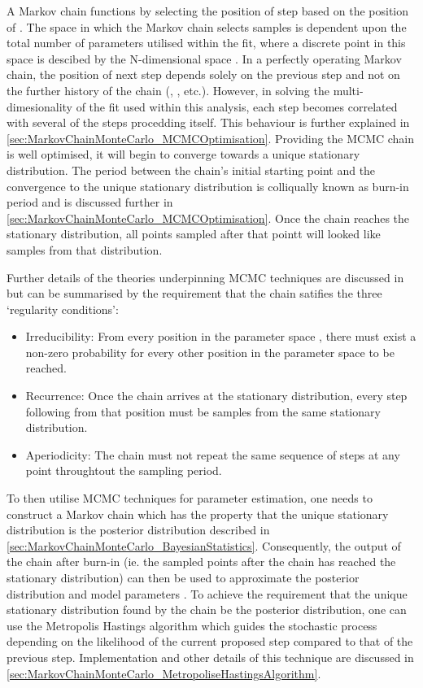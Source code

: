 A Markov chain functions by selecting the position of step  based on the position of . The space in which the Markov chain selects samples is dependent upon the total number of parameters utilised within the fit, where a discrete point in this space is descibed by the N-dimensional space . In a perfectly operating Markov chain, the position of next step depends solely on the previous step and not on the further history of the chain (, , etc.). However, in solving the multi-dimesionality of the fit used within this analysis, each step becomes correlated with several of the steps procedding itself. This behaviour is further explained in \autoref{sec:MarkovChainMonteCarlo_MCMCOptimisation}. Providing the MCMC chain is well optimised, it will begin to converge towards a unique stationary distribution. The period between the chain's initial starting point and the convergence to the unique stationary distribution is colliqually known as burn-in period and is discussed further in \autoref{sec:MarkovChainMonteCarlo_MCMCOptimisation}. Once the chain reaches the stationary distribution, all points sampled after that pointt will looked like samples from that distribution.

Further details of the theories underpinning MCMC techniques are discussed in  but can be summarised by the requirement that the chain satifies the three `regularity conditions':

\begin{itemize}
\item Irreducibility: From every position in the parameter space , there must exist a non-zero probability for every other position in the parameter space to be reached.
\item Recurrence: Once the chain arrives at the stationary distribution, every step following from that position must be samples from the same stationary distribution.
\item Aperiodicity: The chain must not repeat the same sequence of steps at any point throughtout the sampling period.
\end{itemize}

To then utilise MCMC techniques for parameter estimation, one needs to construct a Markov chain which has the property that the unique stationary distribution is the posterior distribution described in \autoref{sec:MarkovChainMonteCarlo_BayesianStatistics}. Consequently, the output of the chain after burn-in (ie. the sampled points after the chain has reached the stationary distribution) can then be used to approximate the posterior distribution and model parameters \quickmath{\vec{\theta}}. To achieve the requirement that the unique stationary distribution found by the chain be the posterior distribution, one can use the Metropolis Hastings algorithm which guides the stochastic process depending on the likelihood of the current proposed step compared to that of the previous step. Implementation and other details of this technique are discussed in \autoref{sec:MarkovChainMonteCarlo_MetropoliseHastingsAlgorithm}.

